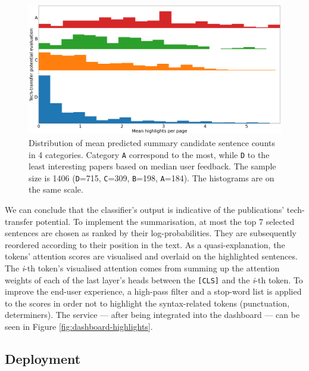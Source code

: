 \begin{figure}
    \centering
    \includegraphics[width=0.85\linewidth]{figures/highlights-histograms.png}
    \caption{Distribution of mean predicted summary candidate sentence counts in 4 categories. Category \texttt{A} correspond to the most, while \texttt{D} to the least interesting papers based on median user feedback. The sample size is 1406 (\texttt{D}=715, \texttt{C}=309, \texttt{B}=198, \texttt{A}=184). The histograms are on the same scale.}
    \label{fig:histograms}
\end{figure}

We can conclude that the classifier's output is indicative of the publications' tech-transfer potential. To implement the summarisation, at most the top 7 selected sentences are chosen as ranked by their log-probabilities. They are subsequently reordered according to their position in the text. As a quasi-explanation, the tokens' attention scores are visualised and overlaid on the highlighted sentences. The \textit{i}-th token's visualised attention comes from summing up the attention weights of each of the last layer's heads between the \texttt{[CLS]} and the \textit{i}-th token. To improve the end-user experience, a high-pass filter and a stop-word list is applied to the scores in order not to highlight the syntax-related tokens (punctuation, determiners). The service --- after being integrated into the dashboard --- can be seen in Figure \ref{fig:dashboard-highlights}.

\subsection{Deployment}

